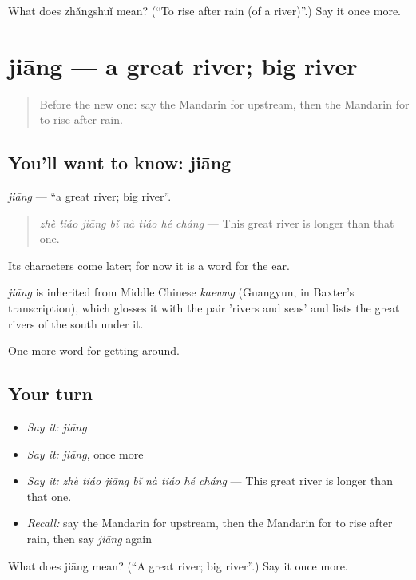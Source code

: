 \begin{tcolorbox}[breakable,colback=teal!4,colframe=teal!35!black,title={Before you move on}]
What does zhǎngshuǐ mean? (\textquotedblleft{}To rise after rain (of a river)\textquotedblright{}.) Say it once more.
\end{tcolorbox}
\section[jiāng]{jiāng — a great river; big river}

\label{lesson:ZH-C442-jiang}



\begin{quote}
Before the new one: say the Mandarin for upstream, then the Mandarin for to rise after rain.
\end{quote}

\subsection*{You'll want to know: jiāng}
\emph{jiāng} — \textquotedblleft{}a great river; big river\textquotedblright{}.

\begin{quote}
\emph{zhè tiáo jiāng bǐ nà tiáo hé cháng} — This great river is longer than that one.
\end{quote}

Its characters come later; for now it is a word for the ear.

\begin{cousinweb}
\emph{jiāng} is inherited from Middle Chinese \emph{kaewng} (Guangyun, in Baxter's transcription), which glosses it with the pair 'rivers and seas' and lists the great rivers of the south under it.
\end{cousinweb}

\begin{grammarlens}[title={What you've built}]
One more word for getting around.
\end{grammarlens}

\subsection*{Your turn}
\begin{itemize}
\raggedright
  \item \emph{Say it:} \emph{jiāng}
  \item \emph{Say it:} \emph{jiāng}, once more
  \item \emph{Say it:} \emph{zhè tiáo jiāng bǐ nà tiáo hé cháng} — This great river is longer than that one.
  \item \emph{Recall:} say the Mandarin for upstream, then the Mandarin for to rise after rain, then say \emph{jiāng} again
\end{itemize}

\begin{tcolorbox}[breakable,colback=teal!4,colframe=teal!35!black,title={Before you move on}]
What does jiāng mean? (\textquotedblleft{}A great river; big river\textquotedblright{}.) Say it once more.
\end{tcolorbox}
